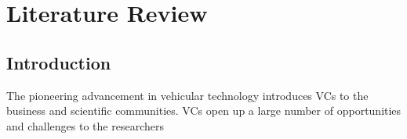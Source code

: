 \chapter{Literature Review}
\section{Introduction}
The pioneering advancement in vehicular technology introduces VCs to the business and scientific communities. VCs open up a large number of opportunities and challenges to the researchers 
